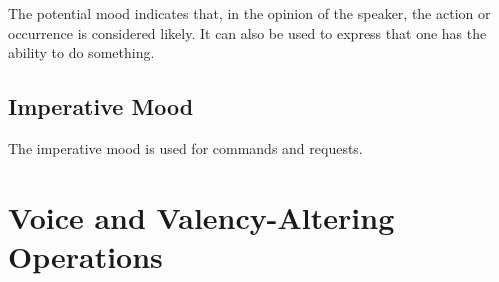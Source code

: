 \documentclass[grammar]{subfiles}
\begin{document}
The potential mood indicates that, in the opinion of the speaker, the
action or occurrence is considered likely.  It can also be used to express that
one has the ability to do something.


\subsection{Imperative Mood}
\label{ssec:vp_imperative}

The imperative mood is used for commands and requests. 


\section{Voice and Valency-Altering Operations}
\label{sec:vp_voice}


%
\end{document}
